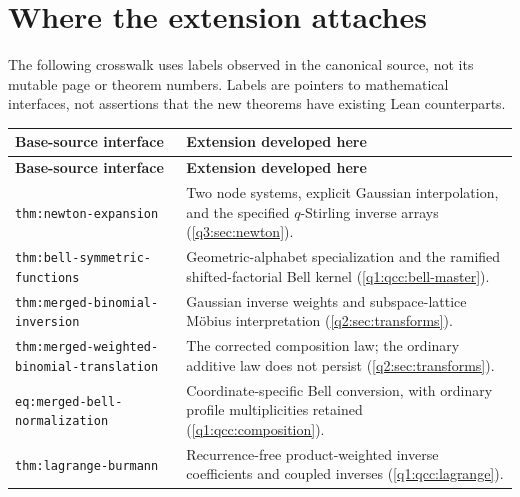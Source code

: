\documentclass[11pt,a4paper,oneside,openany]{book}
\theoremstyle{definition}
\theoremstyle{remark}
\begin{document}
\section{Where the extension attaches}
The following crosswalk uses labels observed in the canonical source, not its
mutable page or theorem numbers. Labels are pointers to mathematical interfaces,
not assertions that the new theorems have existing Lean counterparts.
\begin{longtable}{@{}>{\RaggedRight\arraybackslash}p{}>{\RaggedRight\arraybackslash}p{}@{}}
\toprule
\textbf{Base-source interface} & \textbf{Extension developed here}\\
\midrule
\endfirsthead
\toprule
\textbf{Base-source interface} & \textbf{Extension developed here}\\
\midrule
\endhead
\texttt{thm:newton-\allowbreak{}expansion} & Two node systems, explicit Gaussian interpolation, and the specified $q$-Stirling inverse arrays (\cref{q3:sec:newton}).\\[1mm]
\texttt{thm:bell-\allowbreak{}symmetric-\allowbreak{}functions} & Geometric-alphabet specialization and the ramified shifted-factorial Bell kernel (\cref{q1:qcc:bell-master}).\\[1mm]
\texttt{thm:merged-\allowbreak{}binomial-\allowbreak{}inversion} & Gaussian inverse weights and subspace-lattice M\"obius interpretation (\cref{q2:sec:transforms}).\\[1mm]
\texttt{thm:merged-\allowbreak{}weighted-\allowbreak{}binomial-\allowbreak{}translation} & The corrected composition law; the ordinary additive law does not persist (\cref{q2:sec:transforms}).\\[1mm]
\texttt{eq:merged-\allowbreak{}bell-\allowbreak{}normalization} & Coordinate-specific Bell conversion, with ordinary profile multiplicities retained (\cref{q1:qcc:composition}).\\[1mm]
\texttt{thm:lagrange-\allowbreak{}burmann} & Recurrence-free product-weighted inverse coefficients and coupled inverses (\cref{q1:qcc:lagrange}).\\
\bottomrule
\end{longtable}
\end{document}
